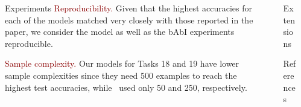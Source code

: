 \documentclass[final,hyperref={pdfpagelabels=false}]{beamer}
\newcommand{\shrink}{-15pt}
\begin{document}
\begin{frame}[t]
\begin{columns}[t]
\begin{column}{.3\textwidth}
\begin{block}{Experiments}
        \textcolor{darkred}{Reproducibility.} Given that the highest accuracies for each of the models matched very closely with those reported in the paper, we consider the model as well as the bAbI experiments reproducible.
        
        \textcolor{darkred}{Sample complexity.} Our models for Tasks 18 and 19 have lower sample complexities since they need 500 examples to reach the highest test accuracies, while~\cite{DBLP:journals/corr/LiTBZ15} used only 50 and 250, respectively.

    \end{block}
    

  \end{column} %


  \begin{column}{.02\textwidth}\end{column} %
    
  \begin{column}{.3\textwidth} %
  
  \vspace{\shrink}
    
    \begin{block}{Extensions}
    
    \end{block}
    
    

    \begin{block}{References}
      \linespread{0.928}\selectfont
      \footnotesize{
      }
    \end{block}
    
    

  \end{column} %

  \begin{column}{.02\textwidth}\end{column} %

\end{columns} %

\end{frame} %
\end{document}
